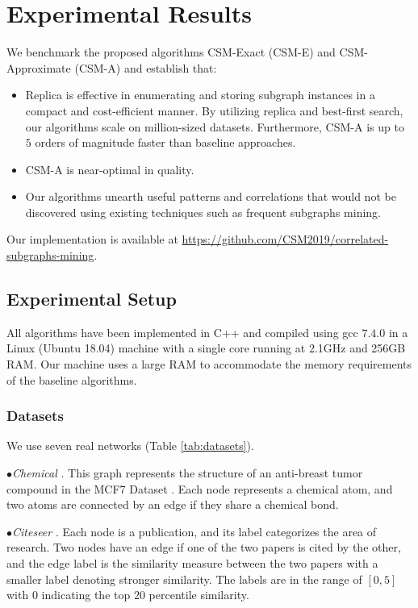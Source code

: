 \vspace{-0.1in}
\section{Experimental Results}
\label{sec:experiments}
%
We benchmark the proposed algorithms {\sf CSM-Exact} ({\sf CSM-E}) and {\sf CSM-Approximate} ({\sf CSM-A}) and establish that:
\begin{itemize}
\item Replica is effective in enumerating and storing subgraph instances in a compact and cost-efficient manner. 
By utilizing replica and best-first search, our algorithms scale on million-sized datasets. Furthermore, {\sf CSM-A}
is up to $5$ orders of magnitude faster than baseline approaches.
\item {\sf CSM-A} is near-optimal in quality.
\item Our algorithms unearth useful patterns and correlations that would not be discovered using existing techniques such as frequent subgraphs mining.
\end{itemize}

Our implementation is available at \url{https://github.com/CSM2019/correlated-subgraphs-mining}.
%
\vspace{-0.1in}
\subsection{Experimental Setup}
\label{sec:setup}
All algorithms have been implemented in C++ and compiled using gcc $7.4.0$ in a Linux (Ubuntu 18.04) machine
with a single core running at 2.1GHz and 256GB RAM. %
Our machine uses a large RAM to accommodate the memory requirements
of the baseline algorithms. %
%
\vspace{-0.1in}
\subsubsection{Datasets}
\label{ref:datasets}
%
We use seven real networks (Table \ref{tab:datasets}).

$\bullet${\textit{Chemical} \cite{chemical_source}}. This graph represents the structure of an anti-breast tumor compound in the
MCF7 Dataset \cite{YH02}. %
Each node represents a chemical atom, and two atoms are connected by an edge if they share a chemical bond.

$\bullet${\textit{Citeseer} \cite{citeseer_source}}. Each node is a publication, and its label categorizes the area of research. 
Two nodes have an edge if one of the two papers is cited by the other, and the edge label is the similarity measure between the two 
papers with a smaller label denoting stronger similarity. The labels are in the range of $[0,5]$ with $0$ indicating the top $20$ percentile similarity. %
%


